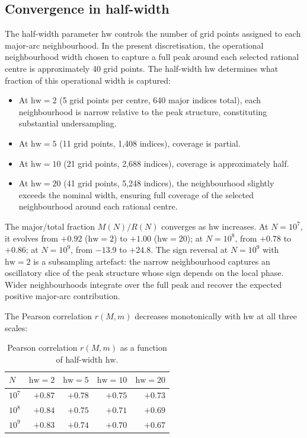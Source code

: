 \documentclass[11pt,a4paper]{article}
\newcommand{\RN}{R(N)}
\newcommand{\MN}{M(N)}
\begin{document}
\subsection{Convergence in half-width}\label{sec:convergence}

The half-width parameter $\mathrm{hw}$ controls the number of grid points assigned to each major-arc neighbourhood. In the present discretisation, the operational neighbourhood width chosen to capture a full peak around each selected rational centre is approximately 40 grid points. The half-width $\mathrm{hw}$ determines what fraction of this operational width is captured:
\begin{itemize}
\item At $\mathrm{hw} = 2$ (5 grid points per centre, 640 major indices total), each neighbourhood is narrow relative to the peak structure, constituting substantial undersampling.
\item At $\mathrm{hw} = 5$ (11 grid points, 1{,}408 indices), coverage is partial.
\item At $\mathrm{hw} = 10$ (21 grid points, 2{,}688 indices), coverage is approximately half.
\item At $\mathrm{hw} = 20$ (41 grid points, 5{,}248 indices), the neighbourhood slightly exceeds the nominal width, ensuring full coverage of the selected neighbourhood around each rational centre.
\end{itemize}

The major/total fraction $\MN/\RN$ converges as $\mathrm{hw}$ increases. At $N = 10^7$, it evolves from $+0.92$ ($\mathrm{hw} = 2$) to $+1.00$ ($\mathrm{hw} = 20$); at $N = 10^8$, from $+0.78$ to $+0.86$; at $N = 10^9$, from $-13.9$ to $+24.8$. The sign reversal at $N = 10^9$ with $\mathrm{hw} = 2$ is a subsampling artefact: the narrow neighbourhood captures an oscillatory slice of the peak structure whose sign depends on the local phase. Wider neighbourhoods integrate over the full peak and recover the expected positive major-arc contribution.

The Pearson correlation $r(M, m)$ decreases monotonically with $\mathrm{hw}$ at all three scales:

\begin{table}[h]
\centering
\begin{tabular}{l rrrr}
\toprule
$N$ & $\mathrm{hw}=2$ & $\mathrm{hw}=5$ & $\mathrm{hw}=10$ & $\mathrm{hw}=20$ \\
\midrule
$10^7$ & $+0.87$ & $+0.78$ & $+0.75$ & $+0.73$ \\
$10^8$ & $+0.84$ & $+0.75$ & $+0.71$ & $+0.69$ \\
$10^9$ & $+0.83$ & $+0.74$ & $+0.70$ & $+0.67$ \\
\bottomrule
\end{tabular}
\caption{Pearson correlation $r(M,m)$ as a function of half-width $\mathrm{hw}$.}
\label{tab:convergence}
\end{table}
\end{document}
